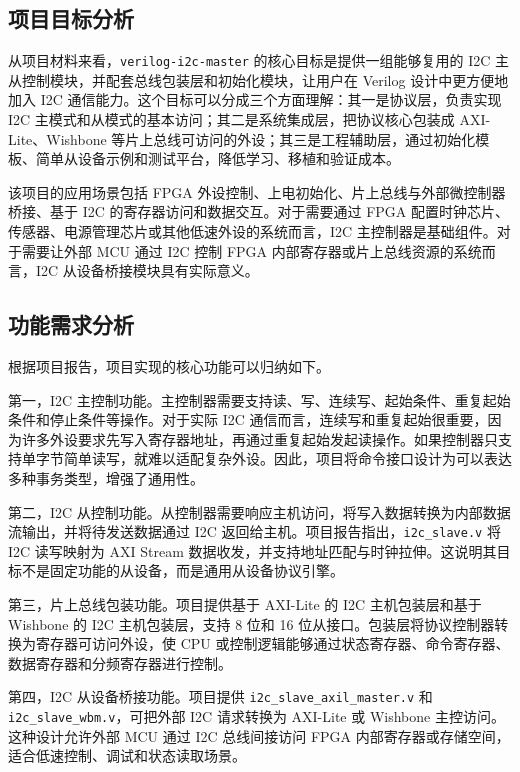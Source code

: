 \documentclass[12pt,a4paper]{article}
\numberwithin{equation}{section}
\begin{document}
\subsection{项目目标分析}

从项目材料来看，\texttt{verilog-i2c-master} 的核心目标是提供一组能够复用的 I2C 主从控制模块，并配套总线包装层和初始化模块，让用户在 Verilog 设计中更方便地加入 I2C 通信能力。这个目标可以分成三个方面理解：其一是协议层，负责实现 I2C 主模式和从模式的基本访问；其二是系统集成层，把协议核心包装成 AXI-Lite、Wishbone 等片上总线可访问的外设；其三是工程辅助层，通过初始化模板、简单从设备示例和测试平台，降低学习、移植和验证成本。

该项目的应用场景包括 FPGA 外设控制、上电初始化、片上总线与外部微控制器桥接、基于 I2C 的寄存器访问和数据交互。对于需要通过 FPGA 配置时钟芯片、传感器、电源管理芯片或其他低速外设的系统而言，I2C 主控制器是基础组件。对于需要让外部 MCU 通过 I2C 控制 FPGA 内部寄存器或片上总线资源的系统而言，I2C 从设备桥接模块具有实际意义。

\subsection{功能需求分析}

根据项目报告，项目实现的核心功能可以归纳如下。

第一，I2C 主控制功能。主控制器需要支持读、写、连续写、起始条件、重复起始条件和停止条件等操作。对于实际 I2C 通信而言，连续写和重复起始很重要，因为许多外设要求先写入寄存器地址，再通过重复起始发起读操作。如果控制器只支持单字节简单读写，就难以适配复杂外设。因此，项目将命令接口设计为可以表达多种事务类型，增强了通用性。

第二，I2C 从控制功能。从控制器需要响应主机访问，将写入数据转换为内部数据流输出，并将待发送数据通过 I2C 返回给主机。项目报告指出，\texttt{i2c\_slave.v} 将 I2C 读写映射为 AXI Stream 数据收发，并支持地址匹配与时钟拉伸。这说明其目标不是固定功能的从设备，而是通用从设备协议引擎。

第三，片上总线包装功能。项目提供基于 AXI-Lite 的 I2C 主机包装层和基于 Wishbone 的 I2C 主机包装层，支持 8 位和 16 位从接口。包装层将协议控制器转换为寄存器可访问外设，使 CPU 或控制逻辑能够通过状态寄存器、命令寄存器、数据寄存器和分频寄存器进行控制。

第四，I2C 从设备桥接功能。项目提供 \texttt{i2c\_slave\_axil\_master.v} 和 \texttt{i2c\_slave\_wbm.v}，可把外部 I2C 请求转换为 AXI-Lite 或 Wishbone 主控访问。这种设计允许外部 MCU 通过 I2C 总线间接访问 FPGA 内部寄存器或存储空间，适合低速控制、调试和状态读取场景。
\end{document}
